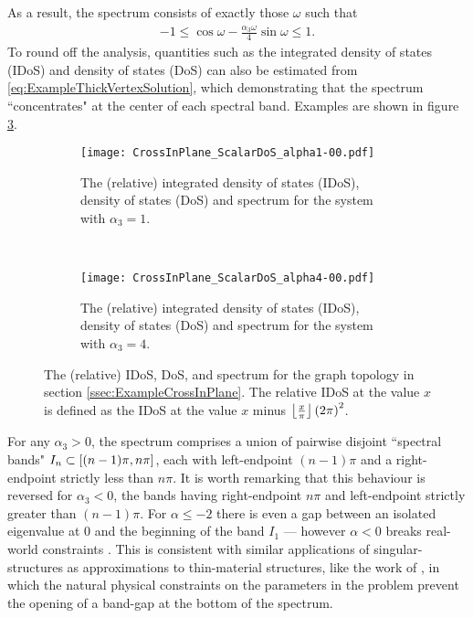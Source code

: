 As a result, the spectrum consists of exactly those $\omega$ such that
\begin{align*}
	-1 \leq \cos\omega - \frac{\alpha_3\omega}{4}\sin\omega \leq 1.
\end{align*}
To round off the analysis, quantities such as the integrated density of states (IDoS) and density of states (DoS) can also be estimated from \eqref{eq:ExampleThickVertexSolution}, which demonstrating that the spectrum ``concentrates" at the center of each spectral band.
Examples are shown in figure \ref{fig:CrossInPlane_ScalarDoS}.
\begin{figure}[b!]
	\begin{subfigure}[t]{0.45\textwidth}
		\centering
		\texttt{[image: CrossInPlane\_ScalarDoS\_alpha1-00.pdf]}
		\caption{\label{fig:CrossInPlane_ScalarDoS_alpha1-00} The (relative) integrated density of states (IDoS), density of states (DoS) and spectrum for the system with $\alpha_3=1$.}
	\end{subfigure}
	~
	\begin{subfigure}[t]{0.45\textwidth}
		\centering
		\texttt{[image: CrossInPlane\_ScalarDoS\_alpha4-00.pdf]}
		\caption{\label{fig:CrossInPlane_ScalarDoS_alpha4-00} The (relative) integrated density of states (IDoS), density of states (DoS) and spectrum for the system with $\alpha_3=4$.}
	\end{subfigure}	
	\caption{\label{fig:CrossInPlane_ScalarDoS} The (relative) IDoS, DoS, and spectrum for the graph topology in section \ref{ssec:ExampleCrossInPlane}.
	The relative IDoS at the value $x$ is defined as the IDoS at the value $x$ minus $\left\lfloor\frac{x}{\pi}\right\rfloor\left( 2\pi \right)^2$.}
\end{figure}
For any $\alpha_3>0$, the spectrum comprises a union of pairwise disjoint ``spectral bands" $I_n\subset\left[ (n-1)\pi, n\pi \right]$, each with left-endpoint $(n-1)\pi$ and a right-endpoint strictly less than $n\pi$.
It is worth remarking that this behaviour is reversed for $\alpha_3<0$, the bands having right-endpoint $n\pi$ and left-endpoint strictly greater than $(n-1)\pi$.
For $\alpha\leq-2$ there is even a gap between an isolated eigenvalue at $0$ and the beginning of the band $I_1$ --- however $\alpha<0$ breaks real-world constraints .
This is consistent with similar applications of singular-structures as approximations to thin-material structures, like the work of \cite{cherednichenko2019time}, in which the natural physical constraints on the parameters in the problem prevent the opening of a band-gap at the bottom of the spectrum.
